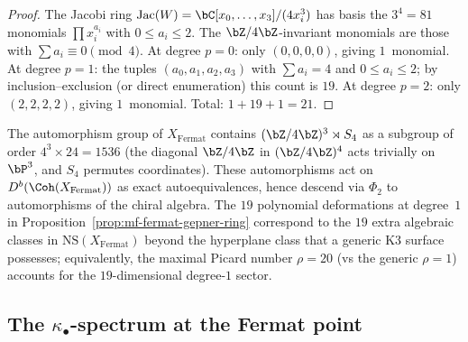 \begin{proof}
The Jacobi ring $\mathrm{Jac}(W) = \bC[x_0, \ldots, x_3]/(4x_i^3)$ has basis the $3^4 = 81$ monomials $\prod x_i^{a_i}$ with $0 \leq a_i \leq 2$. The $\bZ/4\bZ$-invariant monomials are those with $\sum a_i \equiv 0 \pmod{4}$. At degree $p = 0$: only $(0,0,0,0)$, giving $1$~monomial. At degree $p = 1$: the tuples $(a_0, a_1, a_2, a_3)$ with $\sum a_i = 4$ and $0 \leq a_i \leq 2$; by inclusion--exclusion (or direct enumeration) this count is $19$. At degree $p = 2$: only $(2,2,2,2)$, giving $1$~monomial. Total: $1 + 19 + 1 = 21$.
\end{proof}

\begin{remark}
\label{rem:mf-fermat-picard}
The automorphism group of $X_{\mathrm{Fermat}}$ contains $(\bZ/4\bZ)^3 \rtimes S_4$ as a subgroup of order $4^3 \times 24 = 1536$ (the diagonal $\bZ/4\bZ$ in $(\bZ/4\bZ)^4$ acts trivially on $\bP^3$, and $S_4$ permutes coordinates). These automorphisms act on $D^b(\Coh(X_{\mathrm{Fermat}}))$ as exact autoequivalences, hence descend via $\Phi_2$ to automorphisms of the chiral algebra. The $19$ polynomial deformations at degree~$1$ in Proposition~\ref{prop:mf-fermat-gepner-ring} correspond to the $19$ extra algebraic classes in $\mathrm{NS}(X_{\mathrm{Fermat}})$ beyond the hyperplane class that a generic K3 surface possesses; equivalently, the maximal Picard number $\rho = 20$ (vs the generic $\rho = 1$) accounts for the $19$-dimensional degree-$1$ sector.
\end{remark}

\subsection{The \texorpdfstring{$\kappa_\bullet$}{kappa-.}-spectrum at the Fermat point}
\label{subsec:mf-fermat-kappa}

